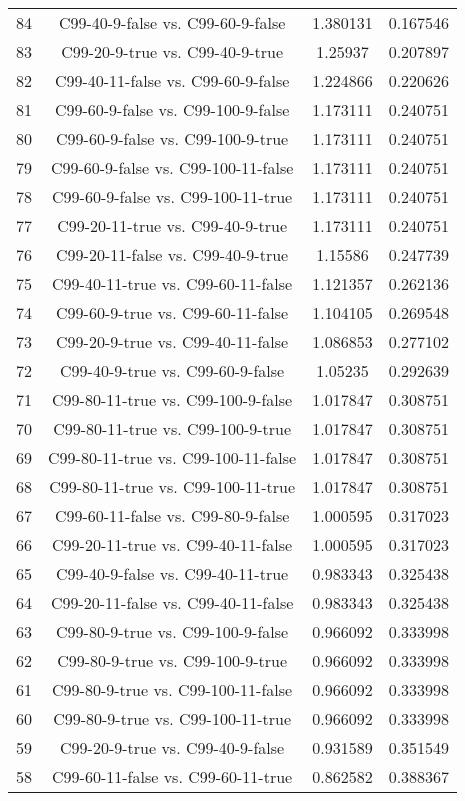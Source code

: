 \documentclass[a4paper,10pt]{article}
\begin{document}
\begin{landscape}
\begin{table}[!htp]
\begin{tabular}{cccc}
84&C99-40-9-false vs. C99-60-9-false&1.380131&0.167546\\
83&C99-20-9-true vs. C99-40-9-true&1.25937&0.207897\\
82&C99-40-11-false vs. C99-60-9-false&1.224866&0.220626\\
81&C99-60-9-false vs. C99-100-9-false&1.173111&0.240751\\
80&C99-60-9-false vs. C99-100-9-true&1.173111&0.240751\\
79&C99-60-9-false vs. C99-100-11-false&1.173111&0.240751\\
78&C99-60-9-false vs. C99-100-11-true&1.173111&0.240751\\
77&C99-20-11-true vs. C99-40-9-true&1.173111&0.240751\\
76&C99-20-11-false vs. C99-40-9-true&1.15586&0.247739\\
75&C99-40-11-true vs. C99-60-11-false&1.121357&0.262136\\
74&C99-60-9-true vs. C99-60-11-false&1.104105&0.269548\\
73&C99-20-9-true vs. C99-40-11-false&1.086853&0.277102\\
72&C99-40-9-true vs. C99-60-9-false&1.05235&0.292639\\
71&C99-80-11-true vs. C99-100-9-false&1.017847&0.308751\\
70&C99-80-11-true vs. C99-100-9-true&1.017847&0.308751\\
69&C99-80-11-true vs. C99-100-11-false&1.017847&0.308751\\
68&C99-80-11-true vs. C99-100-11-true&1.017847&0.308751\\
67&C99-60-11-false vs. C99-80-9-false&1.000595&0.317023\\
66&C99-20-11-true vs. C99-40-11-false&1.000595&0.317023\\
65&C99-40-9-false vs. C99-40-11-true&0.983343&0.325438\\
64&C99-20-11-false vs. C99-40-11-false&0.983343&0.325438\\
63&C99-80-9-true vs. C99-100-9-false&0.966092&0.333998\\
62&C99-80-9-true vs. C99-100-9-true&0.966092&0.333998\\
61&C99-80-9-true vs. C99-100-11-false&0.966092&0.333998\\
60&C99-80-9-true vs. C99-100-11-true&0.966092&0.333998\\
59&C99-20-9-true vs. C99-40-9-false&0.931589&0.351549\\
58&C99-60-11-false vs. C99-60-11-true&0.862582&0.388367\\

\end{tabular}
\end{table}
\end{landscape}
\end{document}
